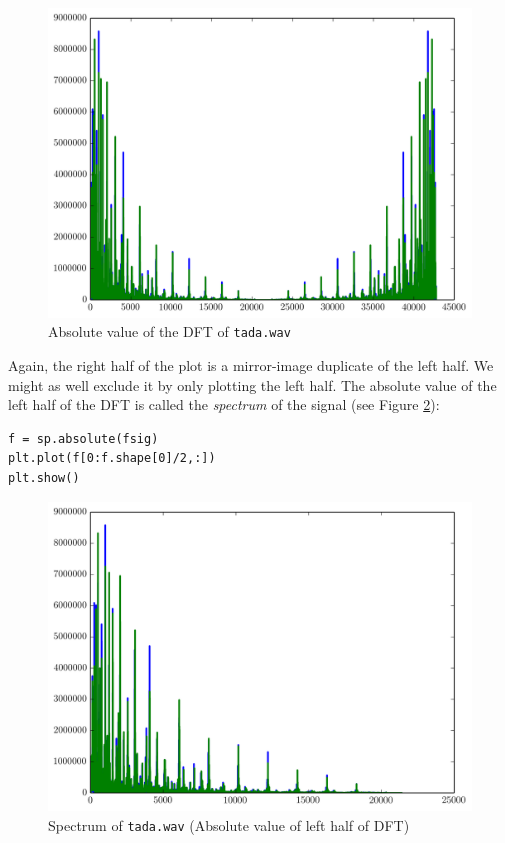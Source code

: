 \begin{figure}[ht]\caption{Absolute value of the DFT of \texttt{tada.wav}}\label{tadaspec}\centering\includegraphics[width=\textwidth]{tadaspec}\end{figure}
Again, the right half of the plot is a mirror-image duplicate of the left half.
We might as well exclude it by only plotting the left half.
The absolute value of the left half of  the DFT is called the \emph{spectrum} of the signal (see Figure \ref{tadaspec2}):
\begin{lstlisting}
f = sp.absolute(fsig)
plt.plot(f[0:f.shape[0]/2,:])
plt.show()
\end{lstlisting}
\begin{figure}[ht]\caption{Spectrum of \texttt{tada.wav} (Absolute value of left half of DFT)}\label{tadaspec2}\centering\includegraphics[width=\textwidth]{tadaspec2}\end{figure}
